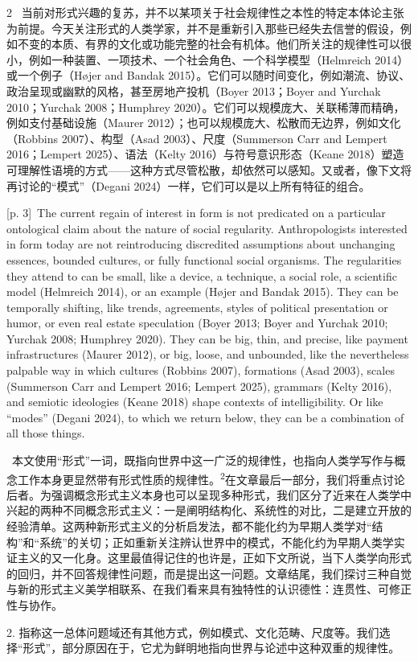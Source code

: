 \documentclass[10pt,a4paper]{article}
\begin{document}
\begin{paracol}{2}
\switchcolumn*
{\scriptsize\color{gray} [p. 3]}\ 当前对形式兴趣的复苏，并不以某项关于社会规律性之本性的特定本体论主张为前提。今天关注形式的人类学家，并不是重新引入那些已经失去信誉的假设，例如不变的本质、有界的文化或功能完整的社会有机体。他们所关注的规律性可以很小，例如一种装置、一项技术、一个社会角色、一个科学模型（Helmreich 2014）或一个例子（Højer and Bandak 2015）。它们可以随时间变化，例如潮流、协议、政治呈现或幽默的风格，甚至房地产投机（Boyer 2013；Boyer and Yurchak 2010；Yurchak 2008；Humphrey 2020）。它们可以规模庞大、关联稀薄而精确，例如支付基础设施（Maurer 2012）；也可以规模庞大、松散而无边界，例如文化（Robbins 2007）、构型（Asad 2003）、尺度（Summerson Carr and Lempert 2016；Lempert 2025）、语法（Kelty 2016）与符号意识形态（Keane 2018）塑造可理解性语境的方式——这种方式尽管松散，却依然可以感知。又或者，像下文将再讨论的“模式”（Degani 2024）一样，它们可以是以上所有特征的组合。\par
\switchcolumn
{\scriptsize\color{gray} [p. 3]}\ The current regain of interest in form is not predicated on a particular ontological claim about the nature of social regularity. Anthropologists interested in form today are not reintroducing discredited assumptions about unchanging essences, bounded cultures, or fully functional social organisms. The regularities they attend to can be small, like a device, a technique, a social role, a scientific model (Helmreich 2014), or an example (Højer and Bandak 2015). They can be temporally shifting, like trends, agreements, styles of political presentation or humor, or even real estate speculation (Boyer 2013; Boyer and Yurchak 2010; Yurchak 2008; Humphrey 2020). They can be big, thin, and precise, like payment infrastructures (Maurer 2012), or big, loose, and unbounded, like the nevertheless palpable way in which cultures (Robbins 2007), formations (Asad 2003), scales (Summerson Carr and Lempert 2016; Lempert 2025), grammars (Kelty 2016), and semiotic ideologies (Keane 2018) shape contexts of intelligibility. Or like “modes” (Degani 2024), to which we return below, they can be a combination of all those things.\par
\switchcolumn*
{\scriptsize\color{gray} [p. 3]}\ 本文使用“形式”一词，既指向世界中这一广泛的规律性，也指向人类学写作与概念工作本身更显然带有形式性质的规律性。\textsuperscript{2}在文章最后一部分，我们将重点讨论后者。为强调概念形式主义本身也可以呈现多种形式，我们区分了近来在人类学中兴起的两种不同概念形式主义：一是阐明结构化、系统性的对比，二是建立开放的经验清单。这两种新形式主义的分析启发法，都不能化约为早期人类学对“结构”和“系统”的关切；正如重新关注辨认世界中的模式，不能化约为早期人类学实证主义的又一化身。这里最值得记住的也许是，正如下文所说，当下人类学向形式的回归，并不回答规律性问题，而是提出这一问题。文章结尾，我们探讨三种自觉与新的形式主义美学相联系、在我们看来具有独特性的认识德性：连贯性、可修正性与协作。\par{\small 2. 指称这一总体问题域还有其他方式，例如模式、文化范畴、尺度等。我们选择“形式”，部分原因在于，它尤为鲜明地指向世界与论述中这种双重的规律性。\par}

\end{paracol}
\end{document}
